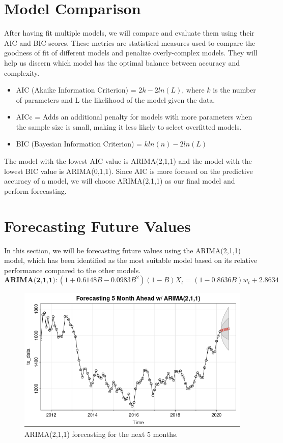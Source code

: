 \documentclass[12pt]{article}
\begin{document}
\section{Model Comparison}
After having fit multiple models, we will compare and evaluate them using their AIC and BIC scores. These metrics are statistical measures used to compare the goodness of fit of different models and penalize overly-complex models. They will help us discern which model has the optimal balance between accuracy and complexity.
\begin{itemize}
  \item AIC (Akaike Information Criterion) = $2k - 2ln(L)$, where $k$ is the number of parameters and L the likelihood of the model given the data.
  \item AICc = Adds an additional penalty for models with more parameters when the sample size is small, making it less likely to select overfitted models. 
  \item BIC (Bayesian Information Criterion) = $kln(n) - 2ln(L)$
\end{itemize}



The model with the lowest AIC value is ARIMA(2,1,1) and the model with the lowest BIC value is ARIMA(0,1,1). Since AIC is more focused on the predictive accuracy of a model, we will choose ARIMA(2,1,1) as our final model and perform forecasting.

\section{Forecasting Future Values}
In this section, we will be forecasting future values using the ARIMA(2,1,1) model, which has been identified as the most suitable model based on its relative performance compared to the other models.
$$\textbf{ARIMA(2,1,1)}: (1+ 0.6148B - 0.0983B^2)(1-B)X_t = (1-0.8636B)w_t + 2.8634$$

\begin{figure}
    \centering
    \includegraphics[width=1\textwidth]{images/forecast.png}
    \caption{ARIMA(2,1,1) forecasting for the next 5 months.}
    \label{fig:enter-label}
\end{figure}
\end{document}
